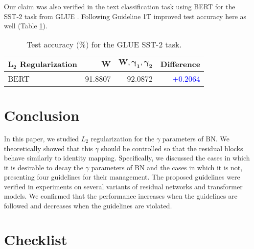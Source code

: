 \documentclass{article}
\begin{document}
Our claim was also verified in the text classification task using BERT for the SST-2 task from GLUE \cite{giclr/WangSMHLB19}. Following Guideline 1T improved test accuracy here as well (Table \ref{tab:sst2}).

\begin{table}[h]
	\caption{Test accuracy (\%) for the GLUE SST-2 task.}
	\label{tab:sst2}
	\centering
	\begin{tabular}{l|r|r|r}
		\toprule
		$\pmb{L_2}$ \textbf{Regularization} & $\pmb{W}$ & $\pmb{W,\gamma_1,\gamma_2}$ & \textbf{Difference}       \\
		\midrule
		BERT                                & 91.8807   & 92.0872                     & \textcolor{blue}{+0.2064} \\
		\bottomrule
	\end{tabular}
\end{table}

\section{Conclusion}
\label{sec:conclusion}
In this paper, we studied $L_2$ regularization for the $\gamma$ parameters of BN. We theoretically showed that this $\gamma$ should be controlled so that the residual blocks behave similarly to identity mapping. Specifically, we discussed the cases in which it is desirable to decay the $\gamma$ parameters of BN and the cases in which it is not, presenting four guidelines for their management. The proposed guidelines were verified in experiments on several variants of residual networks and transformer models. We confirmed that the performance increases when the guidelines are followed and decreases when the guidelines are violated.

\newpage




\newpage

\section*{Checklist}
\end{document}
